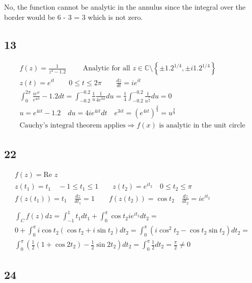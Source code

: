 No, the function cannot be analytic in the annulus since the integral over the border would be 6 - 3 = 3 which is not zero.


\subsection*{13}


\begin{gather*}
	f(z) = \frac{1}{z^4 - 1.2} \qquad \text{ Analytic for all } z \in \mathbb{C} \text{\textbackslash} \left\{\pm 1.2^{1/4}, \pm i 1.2^{1/4}\right\}
	\\
	z(t) = e^{i t} \qquad 0 \leq t \leq 2 \pi
	\qquad
	\frac{dz}{dt} = i e^{i t}
	\\
	\int_0^{2 \pi}{\frac{i e^{i t}}{e^{4 i t}} - 1.2} dt
	=
	\int_{-0.2}^{-0.2}{\frac{1}{u} \frac{1}{4 e^{3 i t}} du}
	=
	\frac{1}{4} \int_{-0.2}^{-0.2}{\frac{1}{u^{\frac{7}{4}}} du} = 0
	\\
	u = e^{4 i t} - 1.2 \quad du = 4 i e^{4 i t} dt \quad e^{3 i t} = \left(e^{4 i t}\right)^{\frac{3}{4}} = u^{\frac{3}{4}}
	\\
	\text{Cauchy's integral theorem applies} \Rightarrow f(x) \text{ is analytic in the unit circle}
\end{gather*}


\subsection*{22}


\begin{gather*}
	f(z) = \text{Re } z
	\\
	z(t_1) = t_1 \quad -1 \leq t_1 \leq 1 \qquad z(t_2) = e^{i t_2} \quad 0 \leq t_2 \leq \pi
	\\
	f(z(t_1)) = t_1 \quad \frac{dz}{dt_1} = 1 \qquad f(z(t_2)) = \cos{t_2} \quad \frac{dz}{dt_2} = i e^{i t_2}
	\\
	\\
	\int_C{f(z) dz} = \int_{-1}^{1}{t_1 dt_1} + \int_0^\pi{\cos{t_2} i e^{i t_2} dt_2} =
	\\
	0 + \int_0^\pi{i \cos{t_2} (\cos{t_2} + i \sin{t_2}) dt_2}
	=
	\int_0^\pi{(i \cos^2{t_2} - \cos{t_2} \sin{t_2}) dt_2}
	=
	\\
	\int_0^\pi{\left(\frac{1}{2} (1 + \cos{2 t_2}) - \frac{1}{2} \sin{2 t_2}\right) dt_2}
	=
	\int_0^\pi{\frac{1}{2}dt_2} = \frac{\pi}{2} \neq 0
\end{gather*}


\subsection*{24}


